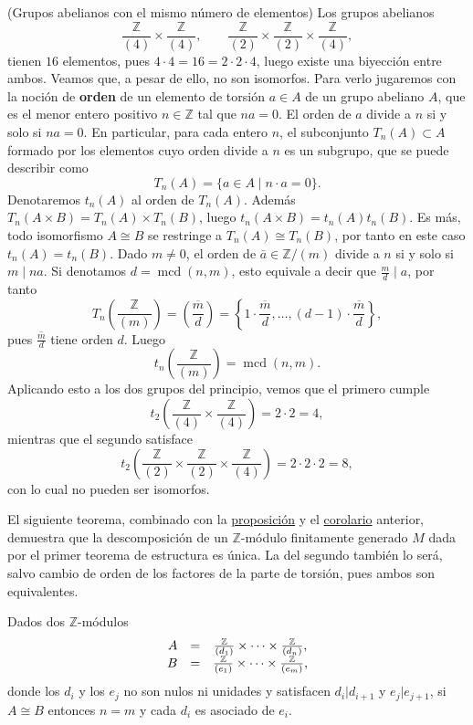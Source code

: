 \textrm{\normalfont (Grupos abelianos con el mismo número de elementos)}
Los grupos abelianos
\[\frac{\mathbb{Z}}{(4)}\times \frac{\mathbb{Z}}{(4)},\qquad\frac{\mathbb{Z}}{(2)}\times \frac{\mathbb{Z}}{(2)}\times \frac{\mathbb{Z}}{(4)},\]
tienen \(16\) elementos, pues \(4\cdot 4=16=2\cdot 2\cdot 4\), luego
existe una biyección entre ambos. Veamos que, a pesar de ello, no son
isomorfos. Para verlo jugaremos con la noción de \textbf{orden} de un
elemento de torsión \(a\in A\) de un grupo abeliano \(A\), que es el
menor entero positivo \(n\in\mathbb Z\) tal que \(na=0\). El orden de
\(a\) divide a \(n\) si y solo si \(na=0\). En particular, para cada
entero \(n\), el subconjunto \(T_n(A)\subset A\) formado por los
elementos cuyo orden divide a \(n\) es un subgrupo, que se puede
describir como \[T_n(A)=\{a\in A\mid n\cdot a=0\}.\] Denotaremos
\(t_n(A)\) al orden de \(T_n(A)\). Además
\(T_n(A\times B)=T_n(A)\times T_n(B)\), luego
\(t_n(A\times B)=t_n(A)t_n(B)\). Es más, todo isomorfismo
\(A\cong B\) se restringe a \(T_n(A)\cong T_n(B)\), por tanto en este
caso \(t_n(A)=t_n(B)\). Dado \(m\neq 0\), el orden de
\(\bar a\in\mathbb Z/(m)\) divide a \(n\) si y solo si \(m\mid na\). Si
denotamos \(d=\operatorname{mcd}(n,m)\), esto equivale a decir que
\(\frac{m}{d}\mid a\), por tanto
\[T_n\left(\frac{\mathbb{Z}}{(m)}\right)=\left(\overline{\frac{m}{d}}\right)=\left\{1\cdot\overline{\frac{m}{d}},\dots,(d-1)\cdot \overline{\frac{m}{d}}\right\},\]
pues \(\overline{\frac{m}{d}}\) tiene orden \(d\). Luego
\[t_n\left(\frac{\mathbb{Z}}{(m)}\right)=\operatorname{mcd}(n,m).\]
Aplicando esto a los dos grupos del principio, vemos que el primero
cumple
\[t_2\left(\frac{\mathbb{Z}}{(4)}\times \frac{\mathbb{Z}}{(4)}\right)=2\cdot 2=4,\]
mientras que el segundo satisface
\[t_2\left(\frac{\mathbb{Z}}{(2)}\times \frac{\mathbb{Z}}{(2)}\times \frac{\mathbb{Z}}{(4)}\right)=2\cdot 2\cdot 2=8,\]
con lo cual no pueden ser isomorfos. 

El siguiente teorema, combinado con la
\protect\hyperlink{partsoffg}{proposición} y el
\protect\hyperlink{equalrank}{corolario} anterior, demuestra que la
descomposición de un \(\mathbb Z\)-módulo finitamente generado \(M\)
dada por el primer teorema de estructura es única. La del segundo
también lo será, salvo cambio de orden de los factores de la parte de
torsión, pues ambos son equivalentes.


Dados dos \(\mathbb Z\)-módulos \[
\begin{array}{rlc}
A&=&\frac{\mathbb Z}{(d_1)}\times \cdots \times\frac{\mathbb Z}{(d_n)},\cr
B&=&\frac{\mathbb Z}{(e_1)}\times \cdots \times\frac{\mathbb Z}{(e_m)},
\end{array}
\] donde los \(d_i\) y los \(e_j\) no son nulos ni unidades y
satisfacen \(d_i|d_{i+1}\) y \(e_j|e_{j+1}\), si \(A\cong B\)
entonces \(n=m\) y cada \(d_i\) es asociado de \(e_i\). 

